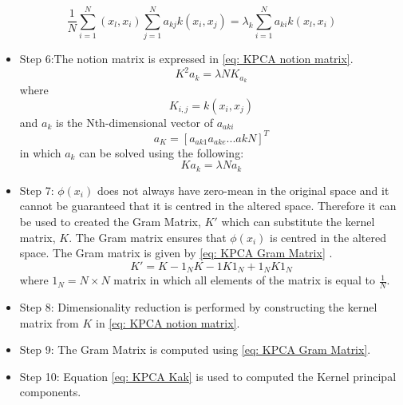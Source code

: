 \documentclass[11pt]{article}
\begin{document}
	\begin{equation}
	\label{eq: KPCA multiplied}
	\frac{1}{N}\sum_{i=1}^{N}(x_l, x_i)\sum_{j=1}^{N}a_{kj}k(x_i, x_j) = \lambda_k\sum_{i=1}^{N}a_{ki}k(x_l, x_i)
	\end{equation}
	\begin{itemize}
		\item Step 6:The notion matrix is expressed in \eqref{eq: KPCA notion matrix}.
		\begin{equation}
			\label{eq: KPCA notion matrix}
			K^2a_k = \lambda N K_{a_k} 
		\end{equation}
		where 
		\begin{equation}
			K_{i,j} = k(x_i, x_j)
		\end{equation}
		and $a_k$ is the Nth-dimensional vector of $a_{aki}$
		\begin{equation}
			a_{K} = [a_{ak1}a_{ake} . . . akN]^T
		\end{equation}
		in which $a_k$ can be solved using the following:
		\begin{equation}
			\label{eq: KPCA Kak}
			Ka_k = \lambda N a_k
		\end{equation} 
		\item Step 7: $\phi(x_i)$ does not always have zero-mean in the original space and it cannot be guaranteed that it is centred in the altered space. Therefore it can be used to created the Gram Matrix, $K'$ which can substitute the kernel matrix, $K$. The Gram matrix ensures that $\phi(x_i)$ is centred in the altered space. The Gram matrix is given by \eqref{eq: KPCA Gram Matrix} \cite{Ibrahim_Baharudin2016} \cite{Scholkopf2012}.
		\begin{equation}
			\label{eq: KPCA Gram Matrix}
			K' = K - 1_N K - 1K1_N + 1_NK1_N
		\end{equation}
		where $1_N = N \times N$ matrix in which all elements of the matrix is equal to $\frac{1}{N}$.\\
		\item Step 8: Dimensionality reduction is performed by constructing the kernel matrix from $K$ in \eqref{eq: KPCA notion matrix}. \\
		\item Step 9: The Gram Matrix is computed using \eqref{eq: KPCA Gram Matrix}. \\
		\item Step 10: Equation \eqref{eq: KPCA Kak} is used to computed the Kernel principal components.
	\end{itemize}
\end{document}
